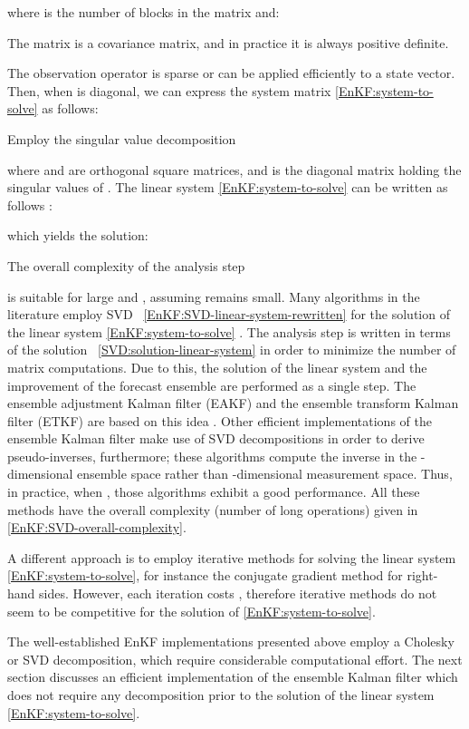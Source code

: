 \documentclass[12pt]{article}
\begin{document}
where  is the number of blocks in the matrix  and:

The matrix  is a covariance matrix, and in practice it is always positive definite.

The observation operator  is sparse or can be applied efficiently to a state vector. Then, when  is diagonal, we can express the system matrix \eqref{EnKF:system-to-solve} as follows:

Employ the singular value decomposition

where  and  are orthogonal square matrices, and  is the diagonal matrix holding the singular values of . The linear system \eqref{EnKF:system-to-solve} can be written as follows \cite{Jan06}:

which yields the solution:

The overall complexity of the analysis step

is suitable for large  and , assuming  remains small.
Many algorithms in the literature employ SVD ~\eqref{EnKF:SVD-linear-system-rewritten} for  the solution of the linear system \eqref{EnKF:system-to-solve} \cite{Evensen2009}. The analysis step is written in terms of the solution ~\eqref{SVD:solution-linear-system} in order to minimize the number of matrix computations. Due to this, the solution of the linear system and the improvement of the forecast ensemble are performed as a single step. The ensemble adjustment Kalman filter (EAKF) and the ensemble transform Kalman filter (ETKF) are based on this idea \cite{Tippett2003}. Other efficient implementations of the ensemble Kalman filter make use of SVD decompositions in order to derive pseudo-inverses, furthermore; these algorithms compute the inverse in the -dimensional ensemble space rather than -dimensional measurement space. Thus, in practice, when , those algorithms exhibit a good performance.
All these methods have the overall complexity (number of long operations) given in  \eqref{EnKF:SVD-overall-complexity}.




A different approach is to employ iterative methods for solving the linear system \eqref{EnKF:system-to-solve}, for instance the conjugate gradient method \cite{Reid72,Golub89,Cohen72,Eis81} for  right-hand sides. However, each iteration costs , therefore iterative methods do not seem to be competitive for the solution of \eqref{EnKF:system-to-solve}.

The well-established EnKF implementations presented above employ a Cholesky or SVD decomposition, which require considerable computational effort.
The next section discusses an efficient implementation of the ensemble Kalman filter which does not require any decomposition prior to the solution of the linear system \eqref{EnKF:system-to-solve}. 
\end{document}

